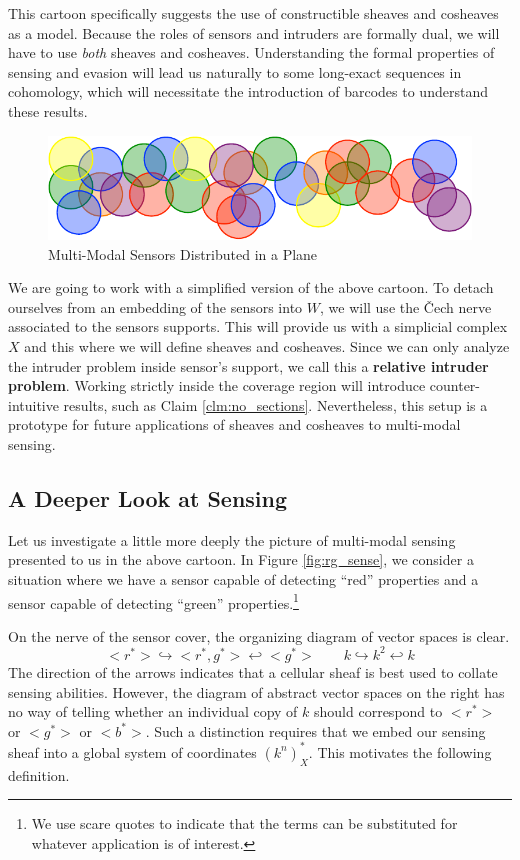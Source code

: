 This cartoon specifically suggests the use of constructible sheaves and cosheaves as a model. Because the roles of sensors and intruders are formally dual, we will have to use \emph{both} sheaves and cosheaves. Understanding the formal properties of sensing and evasion will lead us naturally to some long-exact sequences in cohomology, which will necessitate the introduction of barcodes to understand these results. 

\begin{figure}
\centering
\includegraphics[width=\textwidth]{sensors_color.pdf}
\caption{Multi-Modal Sensors Distributed in a Plane}
\label{fig:sensors5in_color}
\end{figure}

We are going to work with a simplified version of the above cartoon. To detach ourselves from an embedding of the sensors into $W$, we will use the \v{C}ech nerve associated to the sensors supports. This will provide us with a simplicial complex $X$ and this where we will define sheaves and cosheaves. Since we can only analyze the intruder problem inside sensor's support, we call this a \textbf{relative intruder problem}. Working strictly inside the coverage region will introduce counter-intuitive results, such as Claim \ref{clm:no_sections}. Nevertheless, this setup is a prototype for future applications of sheaves and cosheaves to multi-modal sensing.

\subsection{A Deeper Look at Sensing}
\label{subsubsec:deep_sense}

Let us investigate a little more deeply the picture of multi-modal sensing presented to us in the above cartoon. In Figure \ref{fig:rg_sense}, we consider a situation where we have a sensor capable of detecting ``red'' properties and a sensor capable of detecting ``green'' properties.\footnote{We use scare quotes to indicate that the terms can be substituted for whatever application is of interest.}

On the nerve of the sensor cover, the organizing diagram of vector spaces is clear.
\[
	<r^*>\hookrightarrow <r^*,g^*> \hookleftarrow <g^*> \qquad k \hookrightarrow k^2 \hookleftarrow k
\]
The direction of the arrows indicates that a cellular sheaf is best used to collate sensing abilities. However, the diagram of abstract vector spaces on the right has no way of telling whether an individual copy of $k$ should correspond to $<r^*>$ or $<g^*>$ or $<b^*>$. Such a distinction requires that we embed our sensing sheaf into a global system of coordinates $(k^n)^*_X$. This motivates the following definition.


